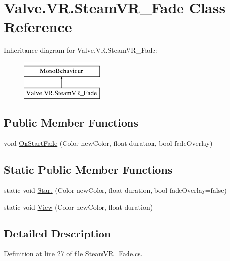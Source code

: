 \hypertarget{class_valve_1_1_v_r_1_1_steam_v_r___fade}{}\section{Valve.\+V\+R.\+Steam\+V\+R\+\_\+\+Fade Class Reference}
\label{class_valve_1_1_v_r_1_1_steam_v_r___fade}
Inheritance diagram for Valve.\+V\+R.\+Steam\+V\+R\+\_\+\+Fade\+:\begin{figure}[H]
\begin{center}
\leavevmode
\includegraphics[height=2.000000cm]{class_valve_1_1_v_r_1_1_steam_v_r___fade}
\end{center}
\end{figure}
\subsection*{Public Member Functions}
\begin{DoxyCompactItemize}
\item 
void \mbox{\hyperlink{class_valve_1_1_v_r_1_1_steam_v_r___fade_aa3a0bdfba958d100b5bc7a0a7aca3fb1}{On\+Start\+Fade}} (Color new\+Color, float duration, bool fade\+Overlay)
\end{DoxyCompactItemize}
\subsection*{Static Public Member Functions}
\begin{DoxyCompactItemize}
\item 
static void \mbox{\hyperlink{class_valve_1_1_v_r_1_1_steam_v_r___fade_abe8618dbc6e97b16736f6104b9509369}{Start}} (Color new\+Color, float duration, bool fade\+Overlay=false)
\item 
static void \mbox{\hyperlink{class_valve_1_1_v_r_1_1_steam_v_r___fade_ae0cfe117cbc12abb4317801382ad5c07}{View}} (Color new\+Color, float duration)
\end{DoxyCompactItemize}


\subsection{Detailed Description}


Definition at line 27 of file Steam\+V\+R\+\_\+\+Fade.\+cs.



